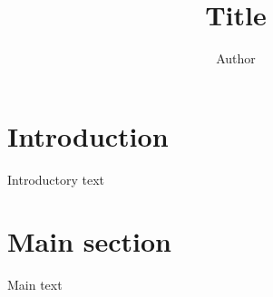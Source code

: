 \documentclass[11pt, a4paper, british]{article}
\begin{document}
	\title{Title}
	\author{Author}
	\date{}

	\maketitle

	\section{Introduction}

		Introductory text

	\section{Main section}

		Main text
\end{document}
